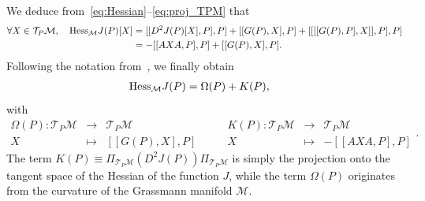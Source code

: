 \documentclass{article}
\newcommand{\1}{{\mathds 1}}
\begin{document}
We deduce from~\eqref{eq:Hessian}--\eqref{eq:proj_TPM} that
\begin{align*} 
\forall X \in \mathcal{T}_{P}\mathcal{M}, \quad \mbox{\rm Hess}_{\mathcal{M}} J(P)[X] &= [[D^2J(P)[X],P],P] + [[G(P), X],P] + [[[[G(P),P],X]],P],P] \nonumber \\
&= -[[AXA,P],P] + [[G(P), X],P].
\end{align*}
Following the notation from~\cite{Cances_2021}, we finally obtain
\begin{align} \label{eq:hessian2}
 \mbox{\rm Hess}_{\mathcal{M}} J(P) &=  \Omega(P) + K(P),
 \end{align}
 with 
 \begin{equation}
\label{eq:omega_2ndorder}
\begin{array}{rcl}
    \Omega(P) :  \mathcal{T}_{P} \mathcal M  & \to &  \mathcal{T}_{P} \mathcal M \\
 X & \mapsto &  [[G(P), X],P] \end{array} \qquad 
 \begin{array}{rcl}
    K(P) :  \mathcal{T}_{P} \mathcal M  & \to &  \mathcal{T}_{P} \mathcal M \\
 X & \mapsto &  -[[AXA,P],P] \end{array}.
\end{equation}
The term $K(P)\equiv \Pi_{\mathcal{T}_{P}\mathcal M}  (D^2J(P)) \Pi_{\mathcal{T}_{P}\mathcal M}$ is simply the projection onto the tangent space of the Hessian of the function $J$, while the term $\Omega(P)$ originates from the curvature of the Grassmann manifold $\mathcal M$.
\end{document}
